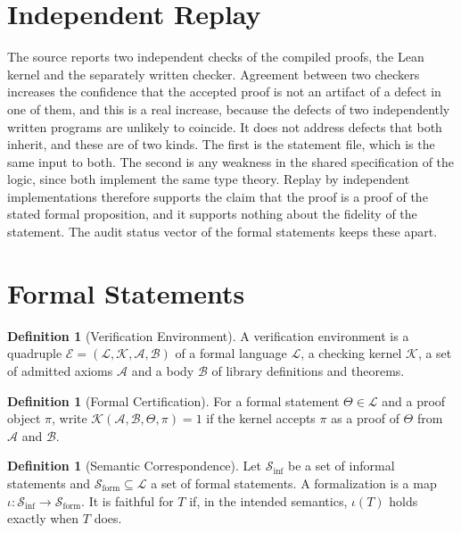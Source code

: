 \documentclass[11pt,letterpaper]{report}
\theoremstyle{plain}
\theoremstyle{definition}
\newtheorem{definition}[theorem]{Definition}
\theoremstyle{remark}
\begin{document}
\section{Independent Replay}

The source reports two independent checks of the compiled proofs, the Lean kernel and the separately written checker. Agreement between two checkers increases the confidence that the accepted proof is not an artifact of a defect in one of them, and this is a real increase, because the defects of two independently written programs are unlikely to coincide. It does not address defects that both inherit, and these are of two kinds. The first is the statement file, which is the same input to both. The second is any weakness in the shared specification of the logic, since both implement the same type theory. Replay by independent implementations therefore supports the claim that the proof is a proof of the stated formal proposition, and it supports nothing about the fidelity of the statement. The audit status vector of the formal statements keeps these apart.

\section{Formal Statements}

\begin{definition}[Verification Environment]\label{def:verifenv}
A verification environment is a quadruple $\mathcal E=(\mathcal L,\mathcal K,\mathcal A,\mathcal B)$ of a formal language $\mathcal L$, a checking kernel $\mathcal K$, a set of admitted axioms $\mathcal A$ and a body $\mathcal B$ of library definitions and theorems.
\end{definition}

\begin{definition}[Formal Certification]
For a formal statement $\Theta\in\mathcal L$ and a proof object $\pi$, write $\mathcal K(\mathcal A,\mathcal B,\Theta,\pi)=1$ if the kernel accepts $\pi$ as a proof of $\Theta$ from $\mathcal A$ and $\mathcal B$.
\end{definition}

\begin{definition}[Semantic Correspondence]
Let $\mathcal S_{\mathrm{inf}}$ be a set of informal statements and $\mathcal S_{\mathrm{form}}\subseteq\mathcal L$ a set of formal statements. A formalization is a map $\iota:\mathcal S_{\mathrm{inf}}\to\mathcal S_{\mathrm{form}}$. It is faithful for $T$ if, in the intended semantics, $\iota(T)$ holds exactly when $T$ does.
\end{definition}
\end{document}
